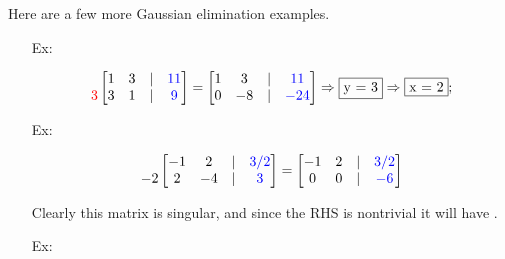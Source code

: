 \documentclass[reqno]{amsart}
\theoremstyle{definition}
\begin{document}
\begin{itemize}
\pagebreak

Here are a few more Gaussian elimination examples.
%
\begin{enumerate}

\item[Ex:   ]  

\begin{equation*}
\begin{matrix}
\\
{\color{red}3}
\end{matrix}\begin{bmatrix}
1 & 3 & | & {\color{blue}11}\\
3 & 1 & | & {\color{blue}9}
\end{bmatrix} = \begin{bmatrix}
1 & 3 & | & {\color{blue}11}\\
0 & -8 & | & {\color{blue}-24}
\end{bmatrix}
\Rightarrow \fbox{y = 3} \Rightarrow \fbox{x = 2};
\end{equation*}

\item[Ex:   ]  

\begin{equation*}
\begin{matrix}
\\
-2
\end{matrix}
\begin{bmatrix}
-1 & 2 & | & {\color{blue}3/2}\\
2 & -4 & | & {\color{blue}3}
\end{bmatrix} = \begin{bmatrix}
-1 & 2 & | & {\color{blue}3/2}\\
0 & 0 & | & {\color{blue}-6}
\end{bmatrix}
\end{equation*}

Clearly this matrix is singular, and since the RHS is nontrivial it will have .

\item[Ex:   ]  


\end{enumerate}
\end{itemize}
\end{document}
